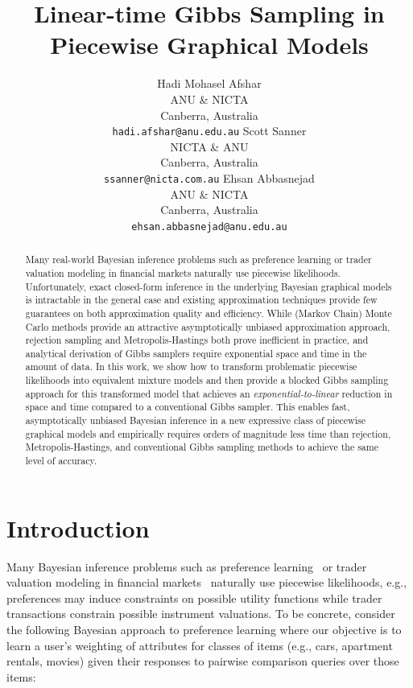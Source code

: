 \documentclass[letterpaper]{article}
\title{
Linear-time Gibbs Sampling in Piecewise Graphical Models
}
\author{
Hadi Mohasel Afshar\\
ANU \& NICTA\\
Canberra, Australia\\
{\tt hadi.afshar@anu.edu.au}
\And
Scott Sanner\\
NICTA \& ANU\\
Canberra, Australia\\
{\tt ssanner@nicta.com.au}
\And
Ehsan Abbasnejad\\
ANU \& NICTA\\
Canberra, Australia\\
{\tt ehsan.abbasnejad@anu.edu.au}
}
\begin{document}
\maketitle

\begin{abstract}
Many real-world Bayesian inference problems such as preference
learning or trader valuation modeling in financial markets naturally
use piecewise likelihoods.  Unfortunately, exact closed-form inference
in the underlying Bayesian graphical models is intractable in the
general case and existing approximation techniques provide few
guarantees on both approximation quality and efficiency.  While
(Markov Chain) Monte Carlo methods provide an attractive
asymptotically unbiased approximation approach, rejection sampling and
Metropolis-Hastings both prove inefficient in practice, and analytical
derivation of Gibbs samplers require exponential space and time in the
amount of data.  In this work, we show how to transform problematic
piecewise likelihoods into equivalent mixture models and then provide
a blocked Gibbs sampling approach for this transformed model that
achieves an \emph{exponential-to-linear} reduction in space and time compared
to a conventional Gibbs sampler.  This enables fast, asymptotically
unbiased Bayesian inference in a new expressive class of piecewise graphical
models and empirically requires orders of magnitude less time than
rejection, Metropolis-Hastings, and conventional Gibbs sampling
methods to achieve the same level of accuracy.
\end{abstract}

\section{Introduction}

Many Bayesian inference problems such as preference
learning~\cite{sanner:aistats10} or trader valuation modeling in
financial markets~\cite{Shogren:00} naturally use piecewise
likelihoods, e.g., preferences may induce
constraints on possible utility functions while trader transactions
constrain possible instrument valuations.  To be concrete, consider
the following Bayesian approach to preference learning where our
objective is to learn a user's weighting of attributes for
classes of items (e.g., cars, apartment rentals, movies) given their
responses to pairwise comparison queries over those items:
\end{document}
